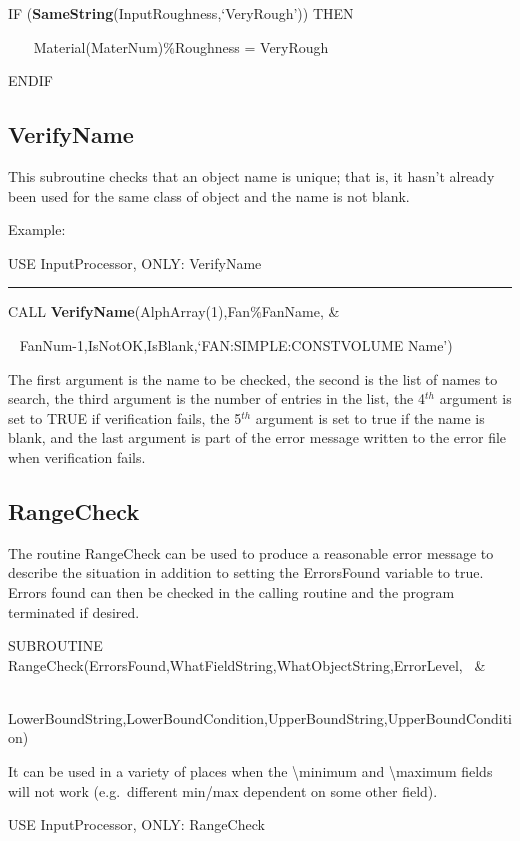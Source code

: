 IF (\textbf{SameString}(InputRoughness,`VeryRough')) THEN

~~~ Material(MaterNum)\%Roughness = VeryRough

ENDIF

\subsection{VerifyName}\label{verifyname}

This subroutine checks that an object name is unique; that is, it hasn't already been used for the same class of object and the name is not blank.

Example:

USE InputProcessor, ONLY: VerifyName

\begin{center}\rule{0.5\linewidth}{0.4pt}\end{center}

CALL \textbf{VerifyName}(AlphArray(1),Fan\%FanName, \&

~ FanNum-1,IsNotOK,IsBlank,`FAN:SIMPLE:CONSTVOLUME Name')

The first argument is the name to be checked, the second is the list of names to search, the third argument is the number of entries in the list, the 4\(^{th}\) argument is set to TRUE if verification fails, the 5\(^{th}\) argument is set to true if the name is blank, and the last argument is part of the error message written to the error file when verification fails.

\subsection{RangeCheck}\label{rangecheck}

The routine RangeCheck can be used to produce a reasonable error message to describe the situation in addition to setting the ErrorsFound variable to true.~ Errors found can then be checked in the calling routine and the program terminated if desired.

SUBROUTINE RangeCheck(ErrorsFound,WhatFieldString,WhatObjectString,ErrorLevel,~ \&

~~~~~~~~~~~~~~~~~~~~~ LowerBoundString,LowerBoundCondition,UpperBoundString,UpperBoundCondition)

It can be used in a variety of places when the \textbackslash{}minimum and \textbackslash{}maximum fields will not work (e.g.~different min/max dependent on some other field).

USE InputProcessor, ONLY: RangeCheck

